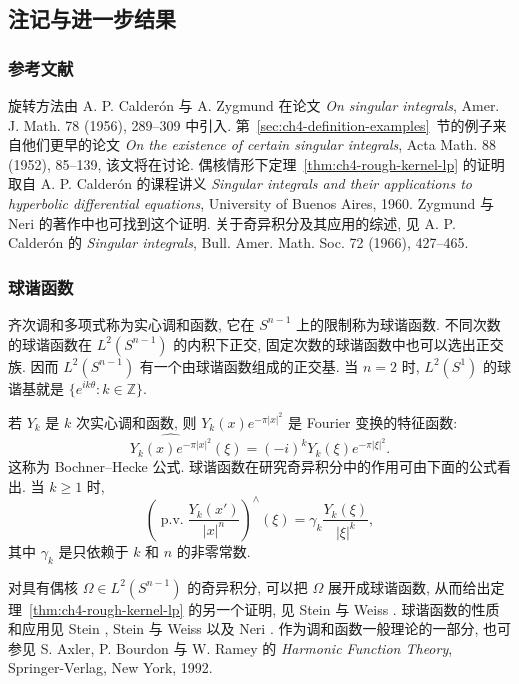 \subsection{注记与进一步结果}
\label{sec:ch4-notes-further-results}

\subsubsection{参考文献}
\label{subsec:ch4-references}

旋转方法由 A. P. Calderón 与 A. Zygmund 在论文 \emph{On singular integrals}, Amer. J. Math. 78 (1956), 289--309 中引入. 第~\ref{sec:ch4-definition-examples}~节的例子来自他们更早的论文 \emph{On the existence of certain singular integrals}, Acta Math. 88 (1952), 85--139, 该文将在讨论. 偶核情形下定理~\ref{thm:ch4-rough-kernel-lp} 的证明取自 A. P. Calderón 的课程讲义 \emph{Singular integrals and their applications to hyperbolic differential equations}, University of Buenos Aires, 1960. Zygmund  与 Neri  的著作中也可找到这个证明. 关于奇异积分及其应用的综述, 见 A. P. Calderón 的 \emph{Singular integrals}, Bull. Amer. Math. Soc. 72 (1966), 427--465.

\subsubsection{球谐函数}
\label{subsec:ch4-spherical-harmonics}

齐次调和多项式称为实心调和函数, 它在 $S^{n-1}$ 上的限制称为球谐函数. 不同次数的球谐函数在 $L^2(S^{n-1})$ 的内积下正交, 固定次数的球谐函数中也可以选出正交族. 因而 $L^2(S^{n-1})$ 有一个由球谐函数组成的正交基. 当 $n=2$ 时, $L^2(S^1)$ 的球谐基就是 $\{e^{ik\theta}:k\in\mathbb Z\}$.

若 $Y_k$ 是 $k$ 次实心调和函数, 则 $Y_k(x)e^{-\pi|x|^2}$ 是 Fourier 变换的特征函数:
\[
 \widehat{Y_k(x)e^{-\pi|x|^2}}(\xi)
 =(-i)^kY_k(\xi)e^{-\pi|\xi|^2}.
\]
这称为 Bochner--Hecke 公式. 球谐函数在研究奇异积分中的作用可由下面的公式看出. 当 $k\ge1$ 时,
\[
 \left(\operatorname{p.v.}\frac{Y_k(x')}{|x|^n}\right)^{\!\wedge}(\xi)
 =\gamma_k\frac{Y_k(\xi)}{|\xi|^k},
\]
其中 $\gamma_k$ 是只依赖于 $k$ 和 $n$ 的非零常数.

\hypertarget{chapter-04-page-098}{}
对具有偶核 $\Omega\in L^2(S^{n-1})$ 的奇异积分, 可以把 $\Omega$ 展开成球谐函数, 从而给出定理~\ref{thm:ch4-rough-kernel-lp} 的另一个证明, 见 Stein 与 Weiss . 球谐函数的性质和应用见 Stein , Stein 与 Weiss  以及 Neri . 作为调和函数一般理论的一部分, 也可参见 S. Axler, P. Bourdon 与 W. Ramey 的 \emph{Harmonic Function Theory}, Springer-Verlag, New York, 1992.

